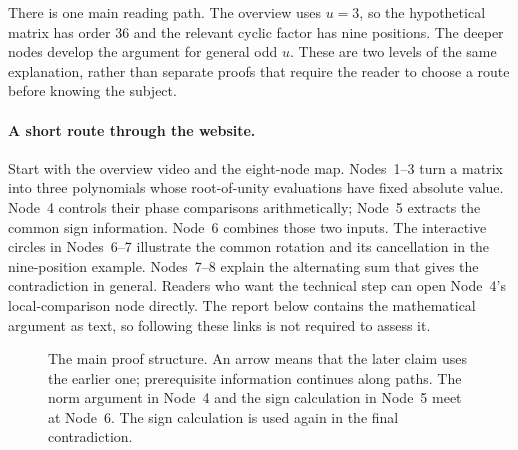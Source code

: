 \documentclass[11pt]{article}
\begin{document}
There is one main reading path. The overview uses $u=3$, so the hypothetical
matrix has order $36$ and the relevant cyclic factor has nine positions.
The deeper nodes develop the argument for general odd $u$. These are two
levels of the same explanation, rather than separate proofs that require
the reader to choose a route before knowing the subject.

\paragraph{A short route through the website.}
Start with the overview video and the eight-node map. Nodes~1--3 turn a
matrix into three polynomials whose root-of-unity evaluations have fixed
absolute value. Node~4 controls their phase comparisons arithmetically;
Node~5 extracts the common sign information. Node~6 combines those two
inputs. The interactive circles in Nodes~6--7 illustrate the common
rotation and its cancellation in the nine-position example. Nodes~7--8
explain the alternating sum that gives the contradiction in general.
Readers who want the technical step can open Node~4's local-comparison
node directly. The report below contains the mathematical argument as
text, so following these links is not required to assess it.

\begin{figure}[htbp]
 \centering
 \caption{The main proof structure. An arrow means that the later claim
 uses the earlier one; prerequisite information continues along paths.
 The norm argument in Node~4 and the sign calculation in Node~5 meet at
 Node~6. The sign calculation is used again in the final contradiction.}%
 \label{fig:map}
\end{figure}
\end{document}
